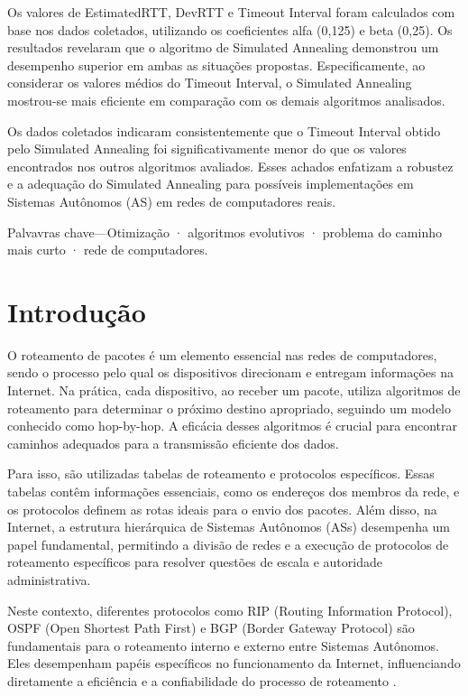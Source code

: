 \documentclass[conference]{IEEEtran}
\begin{document}
Os valores de EstimatedRTT, DevRTT e Timeout Interval foram calculados com base nos dados coletados, utilizando os coeficientes alfa (0,125) e beta (0,25). Os resultados revelaram que o algoritmo de Simulated Annealing demonstrou um desempenho superior em ambas as situações propostas. Especificamente, ao considerar os valores médios do Timeout Interval, o Simulated Annealing mostrou-se mais eficiente em comparação com os demais algoritmos analisados.

Os dados coletados indicaram consistentemente que o Timeout Interval obtido pelo Simulated Annealing foi significativamente menor do que os valores encontrados nos outros algoritmos avaliados. Esses achados enfatizam a robustez e a adequação do Simulated Annealing para possíveis implementações em Sistemas Autônomos (AS) em redes de computadores reais.

Palvavras chave---Otimização · algoritmos evolutivos · problema do caminho mais curto · rede de computadores.

\section{Introdução}
O roteamento de pacotes é um elemento essencial nas redes de computadores, sendo o processo pelo qual os dispositivos direcionam e entregam informações na Internet. Na prática, cada dispositivo, ao receber um pacote, utiliza algoritmos de roteamento para determinar o próximo destino apropriado, seguindo um modelo conhecido como hop-by-hop. A eficácia desses algoritmos é crucial para encontrar caminhos adequados para a transmissão eficiente dos dados.

Para isso, são utilizadas tabelas de roteamento e protocolos específicos. Essas tabelas contêm informações essenciais, como os endereços dos membros da rede, e os protocolos definem as rotas ideais para o envio dos pacotes. Além disso, na Internet, a estrutura hierárquica de Sistemas Autônomos (ASs) desempenha um papel fundamental, permitindo a divisão de redes e a execução de protocolos de roteamento específicos para resolver questões de escala e autoridade administrativa.

Neste contexto, diferentes protocolos como RIP (Routing Information Protocol), OSPF (Open Shortest Path First) e BGP (Border Gateway Protocol) são fundamentais para o roteamento interno e externo entre Sistemas Autônomos. Eles desempenham papéis específicos no funcionamento da Internet, influenciando diretamente a eficiência e a confiabilidade do processo de roteamento \cite{KuroseRoss2010}.
\end{document}
